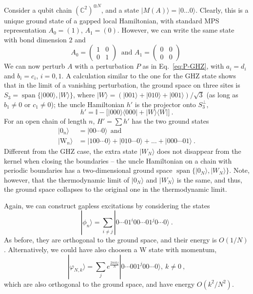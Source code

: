 \documentclass[cmp]{svjour}
\newcommand{\I}{\mathbb{I}}
\DeclareMathOperator{\spann}{span}
\newcommand{\bra}[1]{\langle #1|}
\newcommand{\ket}[1]{|#1\rangle}
\begin{document}
Consider a qubit chain $(\mathbb C^2)^{\otimes N}$, and a state
$\ket{M(A)}=\ket{0\dots0}$.  Clearly, this is a unique ground state of a
gapped local Hamiltonian, with standard MPS representation $A_0=(1)$,
$A_1=(0)$.  However, we can write the same state with bond dimension $2$
and
\[
    A_0=\left(\begin{matrix} 1 & 0 \\ 0 & 1\end{matrix}\right)\
    \mbox{\ and\ }
    A_1=\left(\begin{matrix} 0 & 0 \\ 0 & 0\end{matrix}\right)\
\]
We can now perturb $A$ with a perturbation $P$ as in
Eq.~\eqref{eq:P-GHZ}, with $a_i=d_i$ and $b_i=c_i$, $i=0,1$. A calculation similar to the one for the GHZ state
shows that in the limit of a vanishing perturbation, the ground space on
three sites is $S_3=\spann\{\ket{000},\ket{W}\}$, where
$\ket{W}=(\ket{001}+\ket{010}+\ket{001})/\sqrt{3}$ (as long as $b_1\ne0$
or $c_1\ne0$); the uncle Hamiltonian $h'$ is the projector onto
$S_3^\perp$,
\begin{equation}
    \label{eq:000-uncle-3sites}
    h'=\I - \big[\ket{000}\bra{000}+\ket{W}\bra{W}\big]\ .
\end{equation}
For an open chain of length $n$, $H'=\sum h'$ has the two
ground states
\begin{align*}
    \ket{0_n}          & =\ket{00\cdots 0} \ \ \mathrm{   and}
    \\
    \ket{\mathrm{W}_n} & =\ket{100\cdots 0}+
    \ket{010\cdots0}+\ldots+\ket{000\cdots 01}\ .
\end{align*}
Different from the GHZ case, the extra state $\ket{W_N}$ does not
disappear from the kernel when closing the boundaries -- the uncle Hamiltonian on a chain
with periodic boundaries has a two-dimensional ground space
$\spann\{\ket{0_N},\ket{W_N}\}$. Note, however, that the thermodynamic
limit of $\ket{0_N}$ and $\ket{W_N}$ is the same, and thus, the ground
space collapses to the original one in the thermodynamic limit.

Again, we can construct gapless excitations by considering the states
\begin{equation}
    \ket{\phi_n}=\sum_{i\ne j} \ket{0\cdots 01^i00\cdots 01^j0\cdots 0}\ .
\end{equation}
As before, they are orthogonal to the ground space, and their energy is
$O(1/N)$. Alternatively, we could have also choosen a W state with
momentum,
\[
    \ket{\varphi_{N,k}}=\sum_j e^\frac{2\pi i kj}{N}
    \ket{0\cdots 001^j00\cdots 0}, \ k\ne 0\ ,
\]
which are also orthogonal to the ground space, and have energy $O(k^2/N^2)$.
\end{document}
